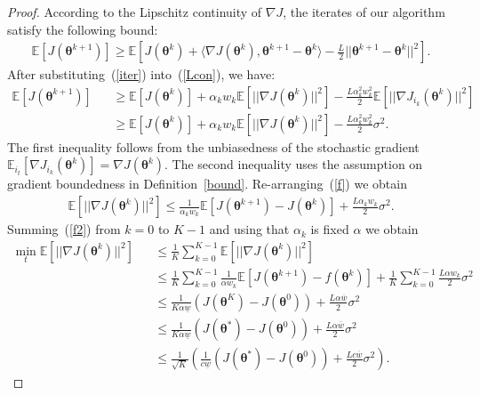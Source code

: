 \begin{proof}
According to the Lipschitz continuity of $\nabla J$, the iterates of our algorithm satisfy the following bound:
\begin{eqnarray}
\mathbb{E}[J(\bm{\theta}^{k+1})] \geq \mathbb{E}[J(\bm{\theta}^k) + \langle\nabla J(\bm{\theta}^k),\bm{\theta}^{k+1}-\bm{\theta}^k\rangle - \frac{L}{2}||\bm{\theta}^{k+1}-\bm{\theta}^k||^2].
\label{Lcon}
\end{eqnarray}
After substituting~(\ref{iter}) into~(\ref{Lcon}), we have:
\begin{eqnarray}
\mathbb{E}[J(\bm{\theta}^{k+1})] 
\!\!\!\!\!\!&& \geq \mathbb{E}[J(\bm{\theta}^k)] + \alpha_kw_k\mathbb{E}[||\nabla J(\bm{\theta}^k)||^2] - \frac{L\alpha_k^2w_k^2}{2}\mathbb{E}[||\nabla J_{i_k}(\bm{\theta}^k)||^2] \nonumber \\
\!\!\!\!\!\!&& \geq \mathbb{E}[J(\bm{\theta}^k)] + \alpha_kw_k\mathbb{E}[||\nabla J(\bm{\theta}^k)||^2] - \frac{L\alpha_k^2w_k^2}{2}\sigma^2. \label{f}
\end{eqnarray}
The first inequality follows from the unbiasedness of the stochastic gradient $\mathbb{E}_{i_t}[\nabla J_{i_k}(\bm{\theta}^k)]=\nabla J(\bm{\theta}^k)$.
The second inequality uses the assumption on gradient boundedness in Definition~\ref{bound}.
Re-arranging~(\ref{f}) we obtain
\begin{eqnarray}
\mathbb{E}[||\nabla J(\bm{\theta}^k)||^2]\le \frac{1}{\alpha_kw_k}\mathbb{E}[J(\bm{\theta}^{k+1})-J(\bm{\theta}^{k})] + \frac{L\alpha_kw_k}{2}\sigma^2.
\label{f2}
\end{eqnarray}
Summing~(\ref{f2}) from $k=0$ to $K-1$ and using that $\alpha_k$ is fixed $\alpha$ we obtain
\begin{eqnarray}
\min_t\mathbb{E}[||\nabla J(\bm{\theta}^k)||^2]
\!\!\!\!\!\!&& \le \frac{1}{K}\sum_{k=0}^{K-1}\mathbb{E}[||\nabla J(\bm{\theta}^k)||^2] \nonumber \\
\!\!\!\!\!\!&& \le \frac{1}{K}\sum_{k=0}^{K-1}\frac{1}{\alpha w_k}\mathbb{E}[J(\bm{\theta}^{k+1})-f(\bm{\theta}^{k})] + \frac{1}{K}\sum_{k=0}^{K-1}\frac{L\alpha w_k}{2}\sigma^2 \nonumber \\
\!\!\!\!\!\!&& \le \frac{1}{K\alpha\underline{w}}\left(J(\bm{\theta}^K)-J(\bm{\theta}^0)\right) + \frac{L\alpha\overline{w}}{2}\sigma^2 \nonumber \\
\!\!\!\!\!\!&& \le \frac{1}{K\alpha\underline{w}}\left(J(\bm{\theta}^*)-J(\bm{\theta}^0)\right) + \frac{L\alpha\overline{w}}{2}\sigma^2 \nonumber \\
\!\!\!\!\!\!&& \le \frac{1}{\sqrt{K}}\left(\frac{1}{c\underline{w}}(J(\bm{\theta}^*)-J(\bm{\theta}^0)) + \frac{Lc\overline{w}}{2}\sigma^2\right).

\end{eqnarray}
\end{proof}
